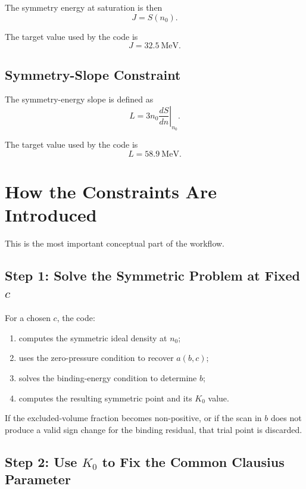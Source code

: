 \documentclass[11pt]{article}
\begin{document}
The symmetry energy at saturation is then
\begin{equation}
J = S(n_0).
\end{equation}

The target value used by the code is
\[
J = 32.5 \ \mathrm{MeV}.
\]

\subsection{Symmetry-Slope Constraint}

The symmetry-energy slope is defined as
\begin{equation}
L = 3 n_0 \left.\frac{dS}{dn}\right|_{n_0}.
\end{equation}

The target value used by the code is
\[
L = 58.9 \ \mathrm{MeV}.
\]

\section{How the Constraints Are Introduced}

This is the most important conceptual part of the workflow.

\subsection{Step 1: Solve the Symmetric Problem at Fixed \texorpdfstring{$c$}{c}}

For a chosen $c$, the code:
\begin{enumerate}
\item computes the symmetric ideal density at $n_0$;
\item uses the zero-pressure condition to recover $a(b,c)$;
\item solves the binding-energy condition to determine $b$;
\item computes the resulting symmetric point and its $K_0$ value.
\end{enumerate}

If the excluded-volume fraction becomes non-positive, or if the scan in $b$
does not produce a valid sign change for the binding residual, that trial point
is discarded.

\subsection{Step 2: Use \texorpdfstring{$K_0$}{K0} to Fix the Common Clausius Parameter}
\end{document}
